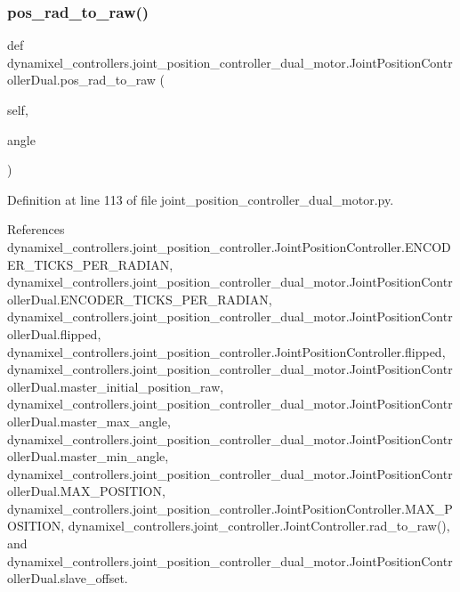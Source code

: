 \subsubsection{\texorpdfstring{pos\+\_\+rad\+\_\+to\+\_\+raw()}{pos\_rad\_to\_raw()}}
{\footnotesize\ttfamily def dynamixel\+\_\+controllers.\+joint\+\_\+position\+\_\+controller\+\_\+dual\+\_\+motor.\+Joint\+Position\+Controller\+Dual.\+pos\+\_\+rad\+\_\+to\+\_\+raw (\begin{DoxyParamCaption}\item[{}]{self,  }\item[{}]{angle }\end{DoxyParamCaption})}



Definition at line 113 of file joint\+\_\+position\+\_\+controller\+\_\+dual\+\_\+motor.\+py.



References dynamixel\+\_\+controllers.\+joint\+\_\+position\+\_\+controller.\+Joint\+Position\+Controller.\+E\+N\+C\+O\+D\+E\+R\+\_\+\+T\+I\+C\+K\+S\+\_\+\+P\+E\+R\+\_\+\+R\+A\+D\+I\+AN, dynamixel\+\_\+controllers.\+joint\+\_\+position\+\_\+controller\+\_\+dual\+\_\+motor.\+Joint\+Position\+Controller\+Dual.\+E\+N\+C\+O\+D\+E\+R\+\_\+\+T\+I\+C\+K\+S\+\_\+\+P\+E\+R\+\_\+\+R\+A\+D\+I\+AN, dynamixel\+\_\+controllers.\+joint\+\_\+position\+\_\+controller\+\_\+dual\+\_\+motor.\+Joint\+Position\+Controller\+Dual.\+flipped, dynamixel\+\_\+controllers.\+joint\+\_\+position\+\_\+controller.\+Joint\+Position\+Controller.\+flipped, dynamixel\+\_\+controllers.\+joint\+\_\+position\+\_\+controller\+\_\+dual\+\_\+motor.\+Joint\+Position\+Controller\+Dual.\+master\+\_\+initial\+\_\+position\+\_\+raw, dynamixel\+\_\+controllers.\+joint\+\_\+position\+\_\+controller\+\_\+dual\+\_\+motor.\+Joint\+Position\+Controller\+Dual.\+master\+\_\+max\+\_\+angle, dynamixel\+\_\+controllers.\+joint\+\_\+position\+\_\+controller\+\_\+dual\+\_\+motor.\+Joint\+Position\+Controller\+Dual.\+master\+\_\+min\+\_\+angle, dynamixel\+\_\+controllers.\+joint\+\_\+position\+\_\+controller\+\_\+dual\+\_\+motor.\+Joint\+Position\+Controller\+Dual.\+M\+A\+X\+\_\+\+P\+O\+S\+I\+T\+I\+ON, dynamixel\+\_\+controllers.\+joint\+\_\+position\+\_\+controller.\+Joint\+Position\+Controller.\+M\+A\+X\+\_\+\+P\+O\+S\+I\+T\+I\+ON, dynamixel\+\_\+controllers.\+joint\+\_\+controller.\+Joint\+Controller.\+rad\+\_\+to\+\_\+raw(), and dynamixel\+\_\+controllers.\+joint\+\_\+position\+\_\+controller\+\_\+dual\+\_\+motor.\+Joint\+Position\+Controller\+Dual.\+slave\+\_\+offset.



